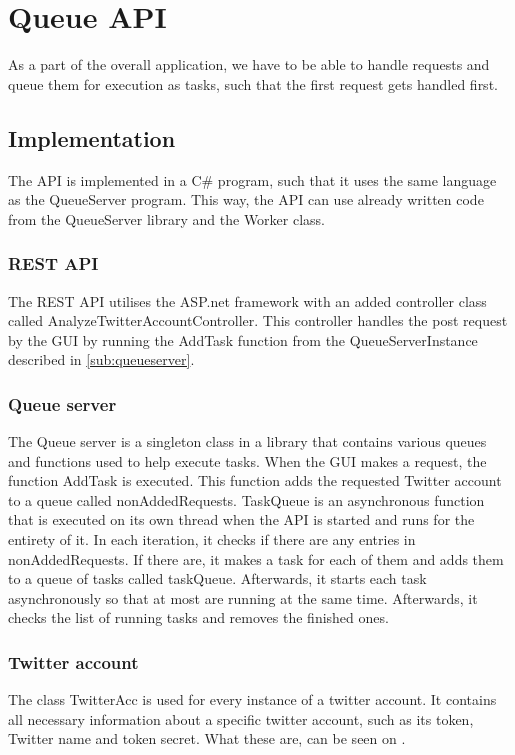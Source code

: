\chapter{Queue \ac{API}}
As a part of the overall application, we have to be able to handle requests
and queue them for execution as tasks, such that the first request gets handled
first.

\section{Implementation}
The \ac{API} is implemented in a C\# program, such that it uses the same
language as the QueueServer program. This way, the \ac{API} can use already
written code from the QueueServer library and the Worker class.

\subsection{\ac{REST} \ac{API}}
The \ac{REST} \ac{API} utilises the ASP.net framework with an added controller
class called AnalyzeTwitterAccountController. This controller handles the post
request by the GUI by running the AddTask function from the QueueServerInstance
described in \autoref{sub:queueserver}.

\subsection{Queue server} \label{sub:queueserver}
The Queue server is a singleton class in a library that contains various
queues and functions used to help execute tasks. When the GUI makes a request,
the function AddTask is executed. This function adds the requested Twitter
account to a queue called nonAddedRequests. TaskQueue is an asynchronous
function that is executed on its own thread when the \ac{API} is started and runs for
the entirety of it. In each iteration, it checks if there are any entries in
nonAddedRequests. If there are, it makes a task for each of them and adds them
to a queue of tasks called taskQueue. Afterwards, it starts each task
asynchronously so that at most 
are running at the same time. Afterwards, it checks the list of
running tasks and removes the finished ones.


\subsection{Twitter account}
The class TwitterAcc is used for every instance of a twitter account. It
contains all necessary information about a specific twitter account, such as its
token, Twitter name and token secret. What these are, can be seen on 
. 

